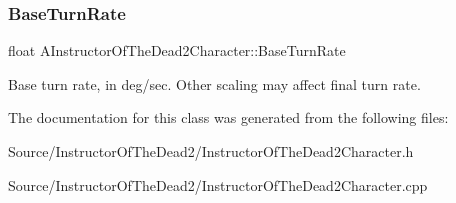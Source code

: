 \subsubsection{\texorpdfstring{Base\+Turn\+Rate}{BaseTurnRate}}
{\footnotesize\ttfamily float A\+Instructor\+Of\+The\+Dead2\+Character\+::\+Base\+Turn\+Rate}

Base turn rate, in deg/sec. Other scaling may affect final turn rate. 

The documentation for this class was generated from the following files\+:\begin{DoxyCompactItemize}
\item 
Source/\+Instructor\+Of\+The\+Dead2/Instructor\+Of\+The\+Dead2\+Character.\+h\item 
Source/\+Instructor\+Of\+The\+Dead2/Instructor\+Of\+The\+Dead2\+Character.\+cpp\end{DoxyCompactItemize}
